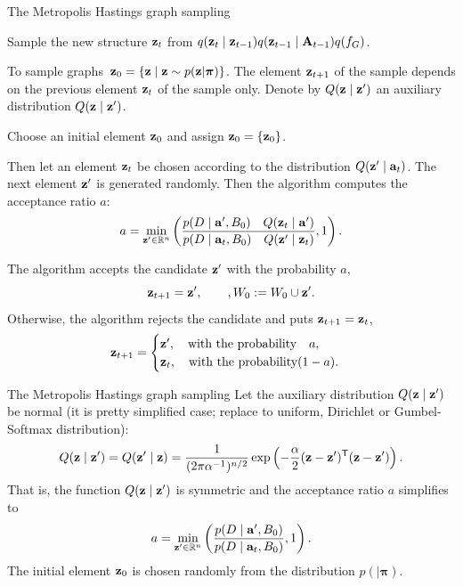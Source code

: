 \documentclass{beamer}
\begin{document}
\begin{frame}{The Metropolis Hastings graph sampling}

Sample the new structure $\mathbf{z}_t$ from  $q(\mathbf{z}_t\mid\mathbf{z}_{t-1})q(\mathbf{z}_{t-1}\mid\mathbf{A}_{t-1})q({f_{G}})$.

\bigskip
To sample graphs~$\mathbf{z}_0 = \{\mathbf{z} \mid \mathbf{z} \sim p(\mathbf{z}|\boldsymbol{\pi})\}$.
The element $\mathbf{z}_{t+1}$ of the sample depends on the previous element $\mathbf{z}_t$ of the sample  only.
Denote by $Q(\mathbf{z} \mid \mathbf{z}^\prime)$ an auxiliary distribution $Q(\mathbf{z}\mid \mathbf{z}^\prime)$.

Choose an initial element $\mathbf{z}_0$ and assign $\mathbf{z}_0 = \{\mathbf{z}_0\}$.

Then let an element $\mathbf{z}_t$ be chosen according  to the distribution $Q(\mathbf{z}^\prime\mid\mathbf{a}_t)$.
The next element $\mathbf{z}^\prime$ is generated randomly.
Then the algorithm computes the acceptance ratio $a$:
\[
    a = \min\limits_{\mathbf{z}^\prime\in\mathbb{R}^n}\left(
    \frac{p(D\mid\mathbf{a}^{\prime}, B_0)\quad Q(\mathbf{z}_t\mid\mathbf{a}^\prime)}
    {p(D\mid\mathbf{a}_t, B_0)\quad Q(\mathbf{z}^\prime\mid \mathbf{z}_t)}, 1\right).
\]

The algorithm accepts the candidate $\mathbf{z}^\prime$ with the probability $a$,
\[
    \mathbf{z}_{t+1} = \mathbf{z}^\prime, \qquad, W_0 := W_0 \cup \mathbf{z}^\prime.
\]
Otherwise, the algorithm rejects the candidate and puts $\mathbf{z}_{t+1} = \mathbf{z}_t$,
\[
\mathbf{z}_{t+1} =
\begin{cases}
\mathbf{z}^\prime, \quad\text{with the probability}\quad a, \\
\mathbf{z}_t,  \quad\text{with the probability} (1-a).
\end{cases}
\]
\end{frame}

\begin{frame}{The Metropolis Hastings graph sampling}
Let the auxiliary distribution $Q(\mathbf{z} \mid \mathbf{z}^\prime)$ be normal (it is pretty simplified case; replace to uniform, Dirichlet or Gumbel-Softmax distribution):
\[
    Q(\mathbf{z} \mid \mathbf{z}^\prime) = Q(\mathbf{z}^\prime \mid \mathbf{z}) = \frac{1}{(2\pi\alpha^{-1})^{n/2}} \exp\left(-\frac{\alpha}{2}(\mathbf{z} - \mathbf{z}^\prime)^{\mathsf{T}} (\mathbf{z} - \mathbf{z}^\prime)\right).
\]
That is, the function $Q(\mathbf{z} \mid \mathbf{z}^\prime)$ is symmetric and
the acceptance ratio $a$ simplifies to
\[
    a = \min\limits_{\mathbf{z}^\prime\in\mathbb{R}^n}\left(
    \frac{p(D\mid\mathbf{a}^{\prime}, B_0)}{p(D\mid\mathbf{a}_t, B_0)}, 1\right).
\]
The initial element $\mathbf{z}_0$ is chosen randomly from the distribution $p(   \mid \boldsymbol{\pi})$.
\end{frame}
\end{document}
